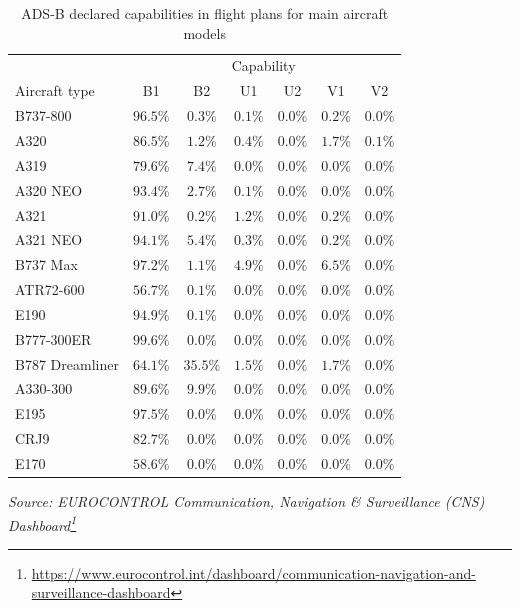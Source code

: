 \documentclass[
  11pt,
  a4paper,
]{book}
\DeclareRobustCommand{\href}[2]{#2\footnote{\url{#1}}}
\begin{document}
\hypertarget{tbl-adsb-aircraft}{}
\setlength{\LTpost}{0mm}
\begin{longtable}{lcccccc}
\caption{\label{tbl-adsb-aircraft}ADS-B declared capabilities in flight plans for main aircraft models }\tabularnewline

\toprule
 & \multicolumn{6}{c}{Capability} \\ 
\cmidrule(lr){2-7}
Aircraft type & B1 & B2 & U1 & U2 & V1 & V2 \\ 
\midrule
B737-800 & $96.5\%$ & $0.3\%$ & $0.1\%$ & $0.0\%$ & $0.2\%$ & $0.0\%$ \\ 
A320 & $86.5\%$ & $1.2\%$ & $0.4\%$ & $0.0\%$ & $1.7\%$ & $0.1\%$ \\ 
A319 & $79.6\%$ & $7.4\%$ & $0.0\%$ & $0.0\%$ & $0.0\%$ & $0.0\%$ \\ 
A320 NEO & $93.4\%$ & $2.7\%$ & $0.1\%$ & $0.0\%$ & $0.0\%$ & $0.0\%$ \\ 
A321 & $91.0\%$ & $0.2\%$ & $1.2\%$ & $0.0\%$ & $0.2\%$ & $0.0\%$ \\ 
A321 NEO & $94.1\%$ & $5.4\%$ & $0.3\%$ & $0.0\%$ & $0.2\%$ & $0.0\%$ \\ 
B737 Max & $97.2\%$ & $1.1\%$ & $4.9\%$ & $0.0\%$ & $6.5\%$ & $0.0\%$ \\ 
ATR72-600 & $56.7\%$ & $0.1\%$ & $0.0\%$ & $0.0\%$ & $0.0\%$ & $0.0\%$ \\ 
E190 & $94.9\%$ & $0.1\%$ & $0.0\%$ & $0.0\%$ & $0.0\%$ & $0.0\%$ \\ 
B777-300ER & $99.6\%$ & $0.0\%$ & $0.0\%$ & $0.0\%$ & $0.0\%$ & $0.0\%$ \\ 
B787 Dreamliner & $64.1\%$ & $35.5\%$ & $1.5\%$ & $0.0\%$ & $1.7\%$ & $0.0\%$ \\ 
A330-300 & $89.6\%$ & $9.9\%$ & $0.0\%$ & $0.0\%$ & $0.0\%$ & $0.0\%$ \\ 
E195 & $97.5\%$ & $0.0\%$ & $0.0\%$ & $0.0\%$ & $0.0\%$ & $0.0\%$ \\ 
CRJ9 & $82.7\%$ & $0.0\%$ & $0.0\%$ & $0.0\%$ & $0.0\%$ & $0.0\%$ \\ 
E170 & $58.6\%$ & $0.0\%$ & $0.0\%$ & $0.0\%$ & $0.0\%$ & $0.0\%$ \\ 
\bottomrule
\end{longtable}
\begin{minipage}{\linewidth}
\emph{Source: \href{https://www.eurocontrol.int/dashboard/communication-navigation-and-surveillance-dashboard}{EUROCONTROL Communication, Navigation \& Surveillance (CNS) Dashboard}}\\
\end{minipage}
\end{document}
